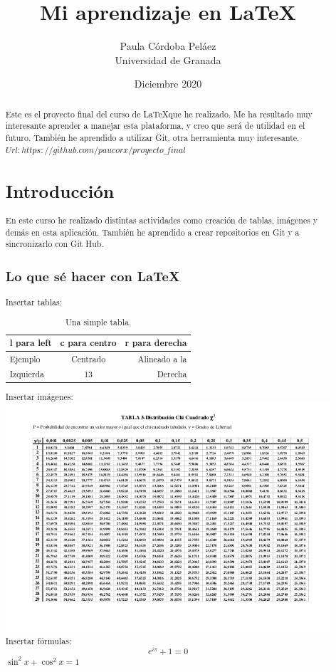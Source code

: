 \documentclass[a4paper]{article}
\title{Mi aprendizaje en  \LaTeX}
\author{Paula Córdoba Peláez\\
  \small Universidad de Granada\\
  \date{Diciembre 2020}
}
\begin{document}
\maketitle
\newpage
\begin{abstract}
Este es el proyecto final del curso de \LaTeX que he realizado.  Me ha resultado muy interesante aprender a manejar esta plataforma, y creo que será de utilidad en el futuro. También he aprendido a utilizar Git,  otra herramienta muy interesante.
$ Url: https://github.com/paucorx/proyecto\_final $
\section{Introducción}
En este curso he realizado distintas actividades como creación de tablas,  imágenes y demás en esta aplicación. También he aprendido a crear repositorios en Git y a sincronizarlo con Git Hub.
\subsection{Lo que sé hacer con \LaTeX}

Insertar tablas:\\
\begin{table}

\end{table}
\begin{table}[H]
\centering
\begin{tabular}{l c r} 
l para left & c para centro & r para derecha \\ \hline
Ejemplo & Centrado & Alineado a la\\
Izquierda & 13 & Derecha
\end{tabular}
\caption{\label{tab:tabla ejemplo}Una simple tabla.}
\end{table}
\newpage
Insertar imágenes: \\
\includegraphics[scale=0.5]{tabl} \\
Insertar fórmulas: \\
\begin{equation}
e^{i\pi} + 1 = 0
\end{equation}
$ \sin^2 x + \cos^2 x = 1 $
\end{abstract}
\newpage


\cite{Latex}
\cite{Zaikov:aa}
\cite{Mabey:1991aa}
\cite{Markovic:aa}
\end{document}
